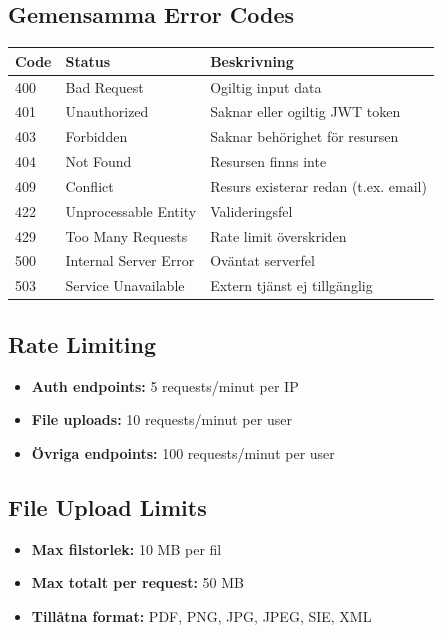 \documentclass[12pt,a4paper]{article}
\begin{document}
\subsection{Gemensamma Error Codes}
\begin{table}[h]
\centering
\begin{tabular}{@{}lll@{}}
\toprule
\textbf{Code} & \textbf{Status} & \textbf{Beskrivning} \\ \midrule
400 & Bad Request & Ogiltig input data \\
401 & Unauthorized & Saknar eller ogiltig JWT token \\
403 & Forbidden & Saknar behörighet för resursen \\
404 & Not Found & Resursen finns inte \\
409 & Conflict & Resurs existerar redan (t.ex. email) \\
422 & Unprocessable Entity & Valideringsfel \\
429 & Too Many Requests & Rate limit överskriden \\
500 & Internal Server Error & Oväntat serverfel \\
503 & Service Unavailable & Extern tjänst ej tillgänglig \\ \bottomrule
\end{tabular}
\end{table}

\subsection{Rate Limiting}
\begin{itemize}[noitemsep]
  \item \textbf{Auth endpoints:} 5 requests/minut per IP
  \item \textbf{File uploads:} 10 requests/minut per user
  \item \textbf{Övriga endpoints:} 100 requests/minut per user
\end{itemize}

\subsection{File Upload Limits}
\begin{itemize}[noitemsep]
  \item \textbf{Max filstorlek:} 10 MB per fil
  \item \textbf{Max totalt per request:} 50 MB
  \item \textbf{Tillåtna format:} PDF, PNG, JPG, JPEG, SIE, XML
\end{itemize}
\end{document}
